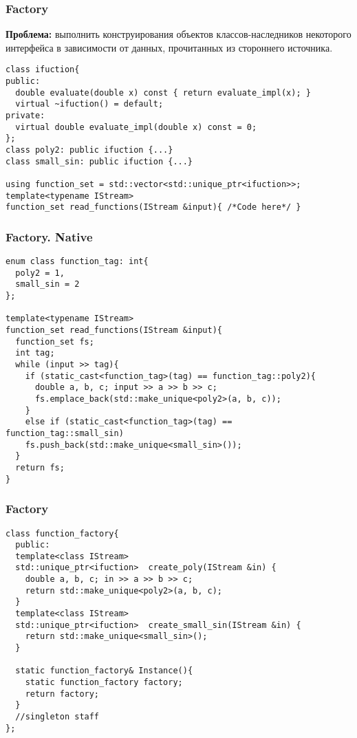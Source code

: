 \begin{frame}[fragile]
  \frametitle{Factory}
  \textbf{Проблема:} выполнить конструирования объектов классов-наследников некоторого интерфейса в зависимости 
  от данных, прочитанных из стороннего источника.
  
  \begin{verbatim}
class ifuction{
public:
  double evaluate(double x) const { return evaluate_impl(x); }
  virtual ~ifuction() = default;
private:
  virtual double evaluate_impl(double x) const = 0;
};
class poly2: public ifuction {...}
class small_sin: public ifuction {...}

using function_set = std::vector<std::unique_ptr<ifuction>>;
template<typename IStream>
function_set read_functions(IStream &input){ /*Code here*/ }
  \end{verbatim}
\end{frame}

\begin{frame}[fragile]
  \frametitle{Factory. Native} 
  \begin{verbatim}
enum class function_tag: int{
  poly2 = 1,
  small_sin = 2
};

template<typename IStream>
function_set read_functions(IStream &input){
  function_set fs;
  int tag;
  while (input >> tag){
    if (static_cast<function_tag>(tag) == function_tag::poly2){
      double a, b, c; input >> a >> b >> c;
      fs.emplace_back(std::make_unique<poly2>(a, b, c));
    }
    else if (static_cast<function_tag>(tag) == function_tag::small_sin)
    fs.push_back(std::make_unique<small_sin>());
  }
  return fs;
}
  \end{verbatim}
\end{frame}

\begin{frame}[fragile]
  \frametitle{Factory} 
  \begin{verbatim}
class function_factory{
  public:
  template<class IStream>
  std::unique_ptr<ifuction>  create_poly(IStream &in) {
    double a, b, c; in >> a >> b >> c;
    return std::make_unique<poly2>(a, b, c);
  }
  template<class IStream>
  std::unique_ptr<ifuction>  create_small_sin(IStream &in) {
    return std::make_unique<small_sin>();
  }
  
  static function_factory& Instance(){
    static function_factory factory;
    return factory;
  }
  //singleton staff
};
  \end{verbatim}
\end{frame}


